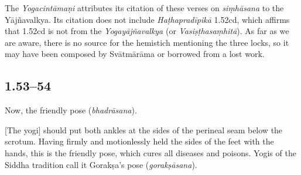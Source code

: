 \begin{ekdosis}
\begin{philcomm}[hp01_051]
The \emph{Yogacintāmaṇi} attributes its citation of these verses on \emph{siṃhāsana} to the Yājñavalkya. Its citation does not include \emph{Haṭhapradīpikā} 1.52cd, which affirms that 1.52cd is not from the \emph{Yogayājñavalkya} (or \emph{Vasiṣṭhasaṃhitā}). As far as we are aware, there is no source for the hemistich mentioning the three locks, so it may have been composed by Svātmārāma or borrowed from a lost work.  
\end{philcomm}







\subsection*{1.53--54}
\begin{translation}[hp01_053]
Now, the friendly pose (\emph{bhadrāsana}).

[The yogi] should put both ankles at the sides of the perineal seam below the scrotum.  Having firmly and motionlessly held the sides of the feet with the hands, this is the friendly pose, which cures all diseases and poisons. Yogis of the Siddha tradition call it Gorakṣa's pose (\emph{gorakṣāsana}).
\end{translation}


\end{ekdosis}
